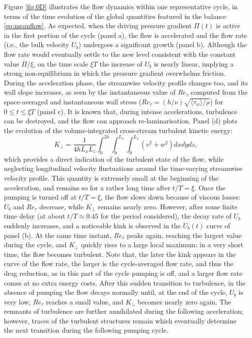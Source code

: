 \documentclass[lineno]{jfm}
\begin{document}
Figure \ref{fig:0D} illustrates the flow dynamics within one representative cycle, in terms of the time evolution of the global quantities featured in the balance \eqref{eq:meanflow}.
As expected, when the driving pressure gradient $\Pi(t)$ is active in the first portion of the cycle (panel a), the flow is accelerated and the flow rate 
(i.e., the bulk velocity $U_b$) undergoes a significant growth (panel b). 
Although the flow rate would eventually settle to the new level consistent with the constant value $\overline{\Pi} / \xi$, on the time scale $\xi T$ the increase of $U_b$ is nearly linear, implying a strong non-equilibrium in which the pressure gradient overwhelms friction. During the acceleration phase, the streamwise velocity profile changes too, and its wall slope increases, as seen by the instantaneous value of $Re_\tau$ computed from the space-averaged and instantaneous wall stress ($Re_\tau=(h/\nu)\sqrt{\langle \tau_w \rangle / \rho}$) for $0 \le t \le \xi T$ (panel c). 
It is known \citep{greenblatt-moss-1999} that, during intense accelerations, turbulence can be destroyed, and the flow can approach re-laminarisation. 
Panel (d) plots the evolution of the volume-integrated cross-stream turbulent kinetic energy:
\[
K_\perp = \frac{1}{4h L_x L_z} \int_0^{2h} \int_0^{L_x} \int_0^{L_z} (v^2 + w^2) dx dy dz ,
\] 
which provides a direct indication of the turbulent state of the flow, while neglecting longitudinal velocity fluctuations around the time-varying streamwise velocity profile. This quantity is extremely small at the beginning of the acceleration, and remains so for a rather long time after $t/T=\xi$.  
Once the pumping is turned off at $t/T=\xi$, the flow slows down because of viscous losses: $U_b$ and $Re_\tau$ decrease, while $K_\perp$ remains nearly zero. However, after some finite time delay (at about $t/T \approx 0.45$ for the period considered), the decay rate of $U_b$ suddenly increases, and a noticeable kink is observed in the $U_b(t)$ curve of panel (b). 
At the same time instant, $Re_\tau$ peaks again, reaching the largest value during the cycle, and $K_\perp$ quickly rises to a large local maximum: in a very short time, the flow becomes turbulent. 
Note that, the later the kink appears in the curve of the flow rate, the larger is the cycle-averaged flow rate, and thus the drag reduction, as in this part of the cycle pumping is off, and a larger flow rate comes at no extra energy costs. 
After this sudden transition to turbulence, in the absence of pumping the flow decays normally until, at the end of the cycle, $U_b$ is very low, $Re_\tau$ reaches a small value, and $K_\perp$ becomes nearly zero again. The remnants of turbulence are further annihilated during the following acceleration; however, traces of the turbulent structures remain which eventually determine the next transition during the following pumping cycle.
\end{document}
